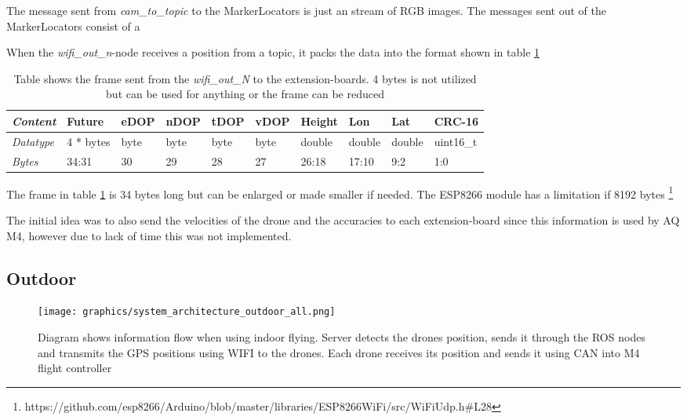 The message sent from \textit{cam\_to\_topic} to the MarkerLocators is just an stream of RGB images. The messages sent out of the MarkerLocators consist of a 

When the \textit{wifi\_out\_n}-node receives a position from a topic, it packs the data into the format shown in table \ref{tab:wifi_frame}

\begin{table}[H]
\centering
\begin{tabular}{@{}|l|l|l|l|l|l|l|l|l|l|l|l|l|@{}}
\toprule
\textit{Content}  & \multicolumn{4}{l|}{Future}    & eDOP & nDOP & tDOP & vDOP & Height & Lon    & Lat    & CRC-16    \\ \midrule
\textit{Datatype} & \multicolumn{4}{l|}{4 * bytes} & byte & byte & byte & byte & double & double & double & uint16\_t \\ \midrule
\textit{Bytes}    & \multicolumn{4}{l|}{34:31}     & 30   & 29   & 28   & 27   & 26:18  & 17:10  & 9:2    & 1:0       \\ \bottomrule
\end{tabular}
\caption{Table shows the frame sent from the \textit{wifi\_out\_N} to the extension-boards. 4 bytes is not utilized but can be used for anything or the frame can be reduced}
\label{tab:wifi_frame}
\end{table}
The frame in table \ref{tab:wifi_frame} is 34 bytes long but can be enlarged or made smaller if needed. The ESP8266 module has a limitation if 8192 bytes \footnote{https://github.com/esp8266/Arduino/blob/master/libraries/ESP8266WiFi/src/WiFiUdp.h\#L28}

The initial idea was to also send the velocities of the drone and the accuracies to each extension-board since this information is used by AQ M4, however due to lack of time this was not implemented.

\subsection{Outdoor}
\begin{figure}[H]
    \center
    \texttt{[image: graphics/system\_architecture\_outdoor\_all.png]}
    \caption{Diagram shows information flow when using indoor flying. Server detects the drones position, sends it through the ROS nodes and transmits the GPS positions using WIFI to the drones. Each drone receives its position and sends it using CAN into M4 flight controller}
    \label{fig:outdoor_information_flow}
\end{figure}


